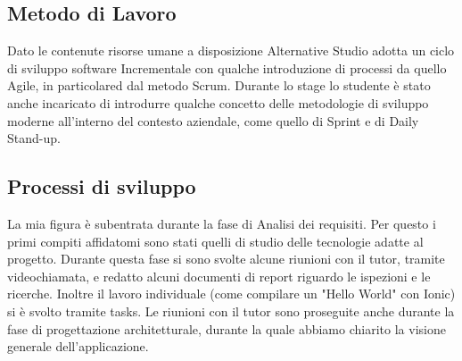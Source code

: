



\subsection{Metodo di Lavoro}
Dato le contenute risorse umane a disposizione Alternative Studio adotta un ciclo di sviluppo software \gls{Incrementale} con qualche
introduzione di processi da quello \gls{Agile}, in particolared dal metodo \gls{Scrum}. Durante lo stage lo studente è stato anche
incaricato di introdurre qualche concetto delle metodologie di sviluppo moderne all'interno del contesto aziendale, come quello di
\gls{Sprint} e di \gls{Daily Stand-up}.

\subsection{Processi di sviluppo}
La mia figura è subentrata durante la fase di Analisi dei requisiti. Per questo i primi compiti affidatomi sono stati quelli di studio delle
tecnologie adatte al progetto. Durante questa fase si sono svolte alcune riunioni con il tutor, tramite videochiamata,
e redatto alcuni documenti di report riguardo le ispezioni e le ricerche. Inoltre il lavoro individuale (come compilare un "Hello World" con Ionic) si è svolto
tramite tasks. Le riunioni con il tutor sono proseguite anche durante la fase di progettazione architetturale, durante la quale abbiamo
chiarito la visione generale dell'applicazione.

